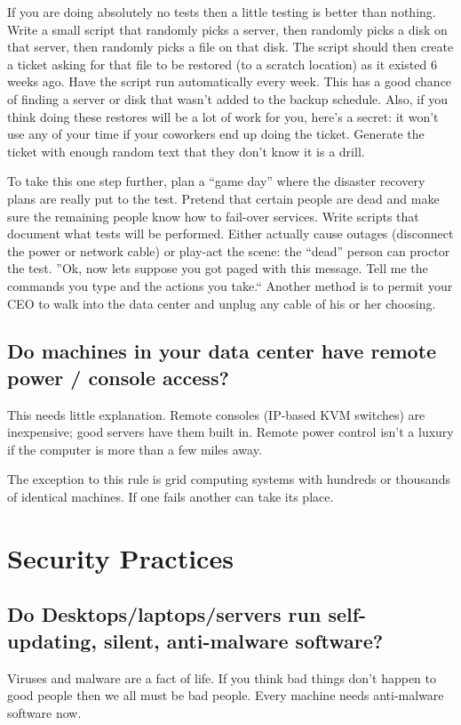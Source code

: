 \documentclass{article}
\begin{document}
If you are doing absolutely no tests then a little testing is better than nothing. Write a small script that randomly picks a server, then randomly picks a disk on that server, then randomly picks a file on that disk. The script should then create a ticket asking for that file to be restored (to a scratch location) as it existed 6 weeks ago. Have the script run automatically every week. This has a good chance of finding a server or disk that wasn't added to the backup schedule. Also, if you think doing these restores will be a lot of work for you, here's a secret: it won't use any of your time if your coworkers end up doing the ticket. Generate the ticket with enough random text that they don't know it is a drill.

To take this one step further, plan a ``game day'' where the disaster recovery plans are really put to the test. Pretend that certain people are dead and make sure the remaining people know how to fail-over services. Write scripts that document what tests will be performed. Either actually cause outages (disconnect the power or network cable) or play-act the scene: the ``dead'' person can proctor the test. ''Ok, now lets suppose you got paged with this message. Tell me the commands you type and the actions you take.`` Another method is to permit your CEO to walk into the data center and unplug any cable of his or her choosing.

\subsection{Do machines in your data center have remote power / console access?}
This needs little explanation. Remote consoles (IP-based KVM switches) are inexpensive; good servers have them built in. Remote power control isn't a luxury if the computer is more than a few miles away.

The exception to this rule is grid computing systems with hundreds or thousands of identical machines. If one fails another can take its place.

\section{Security Practices}
\subsection{Do Desktops/laptops/servers run self-updating, silent, anti-malware software?}
Viruses and malware are a fact of life. If you think bad things don't happen to good people then we all must be bad people. Every machine needs anti-malware software now.
\end{document}
